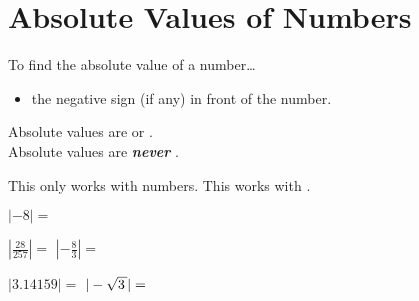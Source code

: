 \section{Absolute Values of Numbers}


\begin{myConcept}{To find the absolute value of a number\dots}
    \begin{itemize}
        \item {} the negative sign (if any) in front of the number.
    \end{itemize}
    \begin{tcolorbox}[center,width=5in,]
        Absolute values are  or .\\[0.25\baselineskip]
        Absolute values are {\bfseries\itshape never} .
    \end{tcolorbox}
    \begin{tcolorbox}[center,width=5in,]
        This only works with numbers.
        This  works with .
    \end{tcolorbox}
\end{myConcept}

{
    $|-8|=$   
}

\myProblemsWithContent
{
    $|\frac{28}{257}|=$   
}
{
    $|-\frac{8}{3}|=$   
}

\myProblemsWithContent
{
    $|3.14159|=$   
}
{
    $|-\myRoot{3}|=$   
}
